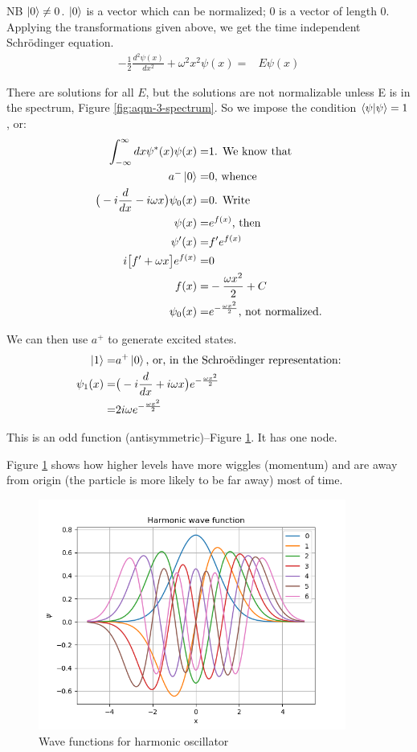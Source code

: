 \documentclass[]{article}
\begin{document}
NB $\ket{0} \ne 0$. $\ket{0}$ is a vector which can be normalized; $0$ is a vector of length 0.
Applying the transformations given above, we get the time independent Schr\"odinger equation.
\begin{align*}
	-\frac{1}{2}\frac{d^2 \psi(x)}{dx^2} + \omega^2 x^2 \psi(x)=& E\psi(x)
\end{align*}

 There are solutions for all $E$, but the solutions are not normalizable unless E is in the spectrum, Figure \ref{fig:aqm-3-spectrum}. So we impose the condition $\braket{\psi|\psi}=1$, or:
\begin{align*}
	\int_{-\infty}^{\infty} dx \psi^*(x) \psi(x) =& 1 \text{. We know that}\\
	a^-\ket{0}=& 0 \text{, whence}\\
	\big(-i \frac{d}{dx} - i \omega x \big)\psi_0(x) =& 0 \text{. Write}\\
	\psi(x)=&e^{f(x)} \text{, then}\\
	\psi^\prime(x) =&f^\prime e^{f(x)}\\
	i \big[f^\prime  + \omega x\big]e^{f(x)} =&0\\
	f(x) =& -\frac{\omega x^2}{2}+C\\
	\psi_0(x) =& e^{-\frac{\omega x^2}{2}} \text{, not normalized.}
\end{align*}

We can then use $a^+$  to generate excited states.
\begin{align*}
	\ket{1}=& a^+ \ket{0} \text{, or, in the Schro\"edinger representation:}\\
	\psi_1(x) =& \big(-i \frac{d}{dx} + i \omega x \big) e^{-\frac{\omega x^2}{2}}\\
	=& 2 i \omega e^{-\frac{\omega x^2}{2}}
\end{align*}

This is an odd function (antisymmetric)--Figure \ref{fig:wave:harmonic}. It has one node.

Figure \ref{fig:wave:harmonic} shows how higher levels have more wiggles (momentum) and are away from origin (the particle is more likely to be far away) most of time.

\begin{figure}[H]
	\caption{Wave functions for harmonic oscillator}\label{fig:wave:harmonic}
	\includegraphics[width=0.9\textwidth]{harmonic_wavefunction}
\end{figure}
\end{document}
